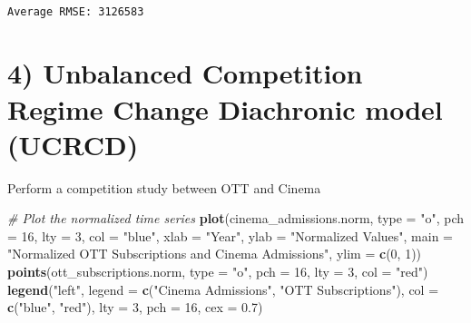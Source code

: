 \documentclass[
]{article}
\newenvironment{Shaded}{\begin{snugshade}}{\end{snugshade}}
\newcommand{\AttributeTok}[1]{\textcolor[rgb]{0.13,0.29,0.53}{#1}}
\newcommand{\CommentTok}[1]{\textcolor[rgb]{0.56,0.35,0.01}{\textit{#1}}}
\newcommand{\DecValTok}[1]{\textcolor[rgb]{0.00,0.00,0.81}{#1}}
\newcommand{\FloatTok}[1]{\textcolor[rgb]{0.00,0.00,0.81}{#1}}
\newcommand{\FunctionTok}[1]{\textcolor[rgb]{0.13,0.29,0.53}{\textbf{#1}}}
\newcommand{\NormalTok}[1]{#1}
\newcommand{\OtherTok}[1]{\textcolor[rgb]{0.56,0.35,0.01}{#1}}
\newcommand{\SpecialCharTok}[1]{\textcolor[rgb]{0.81,0.36,0.00}{\textbf{#1}}}
\newcommand{\StringTok}[1]{\textcolor[rgb]{0.31,0.60,0.02}{#1}}
\begin{document}
\begin{verbatim}

Average RMSE: 3126583
\end{verbatim}

\begin{Shaded}
\end{Shaded}

\section{4) Unbalanced Competition Regime Change Diachronic model
(UCRCD)}\label{unbalanced-competition-regime-change-diachronic-model-ucrcd}

Perform a competition study between OTT and Cinema

\begin{Shaded}
\end{Shaded}

\begin{Shaded}
\begin{Highlighting}[]
\CommentTok{\# Plot the normalized time series}
\FunctionTok{plot}\NormalTok{(cinema\_admissions.norm, }\AttributeTok{type =} \StringTok{"o"}\NormalTok{, }\AttributeTok{pch =} \DecValTok{16}\NormalTok{, }\AttributeTok{lty =} \DecValTok{3}\NormalTok{, }\AttributeTok{col =} \StringTok{"blue"}\NormalTok{,}
    \AttributeTok{xlab =} \StringTok{"Year"}\NormalTok{, }\AttributeTok{ylab =} \StringTok{"Normalized Values"}\NormalTok{, }\AttributeTok{main =} \StringTok{"Normalized OTT Subscriptions and Cinema Admissions"}\NormalTok{,}
    \AttributeTok{ylim =} \FunctionTok{c}\NormalTok{(}\DecValTok{0}\NormalTok{, }\DecValTok{1}\NormalTok{))}
\FunctionTok{points}\NormalTok{(ott\_subscriptions.norm, }\AttributeTok{type =} \StringTok{"o"}\NormalTok{, }\AttributeTok{pch =} \DecValTok{16}\NormalTok{, }\AttributeTok{lty =} \DecValTok{3}\NormalTok{, }\AttributeTok{col =} \StringTok{"red"}\NormalTok{)}
\FunctionTok{legend}\NormalTok{(}\StringTok{"left"}\NormalTok{, }\AttributeTok{legend =} \FunctionTok{c}\NormalTok{(}\StringTok{"Cinema Admissions"}\NormalTok{, }\StringTok{"OTT Subscriptions"}\NormalTok{), }\AttributeTok{col =} \FunctionTok{c}\NormalTok{(}\StringTok{"blue"}\NormalTok{,}
    \StringTok{"red"}\NormalTok{), }\AttributeTok{lty =} \DecValTok{3}\NormalTok{, }\AttributeTok{pch =} \DecValTok{16}\NormalTok{, }\AttributeTok{cex =} \FloatTok{0.7}\NormalTok{)}
\end{Highlighting}
\end{Shaded}
\end{document}
